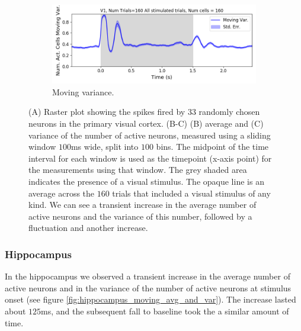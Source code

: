 \begin{figure}[p]
\begin{subfigure}[h]{\linewidth}
        \includegraphics[width=\linewidth]{figures/conway_maxwell/v1_1ms_moving_var_all_stimulated_trials.png}
        \caption{Moving variance.}
        \label{fig:v1_moving_var_num_active_cells}
      \end{subfigure}
      \caption{(A) Raster plot showing the spikes fired by $33$ randomly chosen neurons in the primary visual cortex. (B-C) (B) average and (C) variance of the number of active neurons, measured using a sliding window $100$ms wide, split into $100$ bins. The midpoint of the time interval for each window is used as the timepoint (x-axis point) for the measurements using that window. The grey shaded area indicates the presence of a visual stimulus. The opaque line is an average across the $160$ trials that included a visual stimulus of any kind. We can see a transient increase in the average number of active neurons and the variance of this number, followed by a fluctuation and another increase.}
      \label{fig:v1_moving_avg_and_var}
    \end{figure}

    \subsubsection{Hippocampus}
    In the hippocampus we observed a transient increase in the average number of active neurons and in the variance of the number of active neurons at stimulus onset (see figure \ref{fig:hippocampus_moving_avg_and_var}). The increase lasted about $125$ms, and the subsequent fall to baseline took the a similar amount of time.

